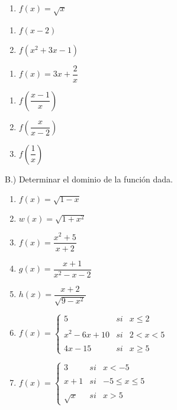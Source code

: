 \documentclass[]{book}
\providecommand{\tightlist}{%
  \setlength{\itemsep}{0pt}\setlength{\parskip}{0pt}}
\theoremstyle{definition}
\theoremstyle{definition}
\theoremstyle{definition}
\theoremstyle{remark}
\begin{document}
\begin{enumerate}
\def\labelenumi{\arabic{enumi}.}
\setcounter{enumi}{9}
\tightlist
\item
  \(f(x)=\sqrt{x}\)
\end{enumerate}

\begin{enumerate}
\def\labelenumi{\alph{enumi}.}
\tightlist
\item
  \(f(x-2)\)
\item
  \(f(x^{2}+3x-1)\)
\end{enumerate}

\begin{enumerate}
\def\labelenumi{\arabic{enumi}.}
\setcounter{enumi}{10}
\tightlist
\item
  \(f(x)=3x+\dfrac{2}{x}\)
\end{enumerate}

\begin{enumerate}
\def\labelenumi{\alph{enumi}.}
\tightlist
\item
  \(f\left( \dfrac{x-1}{x}\right)\)
\item
  \(f\left( \dfrac{x}{x-2}\right)\)
\item
  \(f\left( \dfrac{1}{x}\right)\)
\end{enumerate}

B.) Determinar el dominio de la función dada.

\begin{enumerate}
\def\labelenumi{\arabic{enumi}.}
\item
  \(f(x)=\sqrt{1-x}\)
\item
  \(w(x)=\sqrt{1+x^{2}}\)
\item
  \(f(x)=\dfrac{x^{2}+5}{x+2}\)
\item
  \(g(x)=\dfrac{x+1}{x^{2}-x-2}\)
\item
  \(h(x)=\dfrac{x+2}{\sqrt{9-x^{2}}}\)
\item
  \(f(x)= \left\{ \begin{array}{lcc} 5 & si & x \leq 2 \\ \\ x^2-6x+10 & si & 2 < x < 5 \\ \\ 4x-15 & si & x \geq 5 \end{array} \right.\)
\item
  \(f(x)= \left\{ \begin{array}{lcc} 3 & si & x <-5 \\ \\ x+1 & si & -5 \leq x \leq 5 \\ \\ \sqrt{x} & si & x > 5 \end{array} \right.\)
\end{enumerate}
\end{document}
